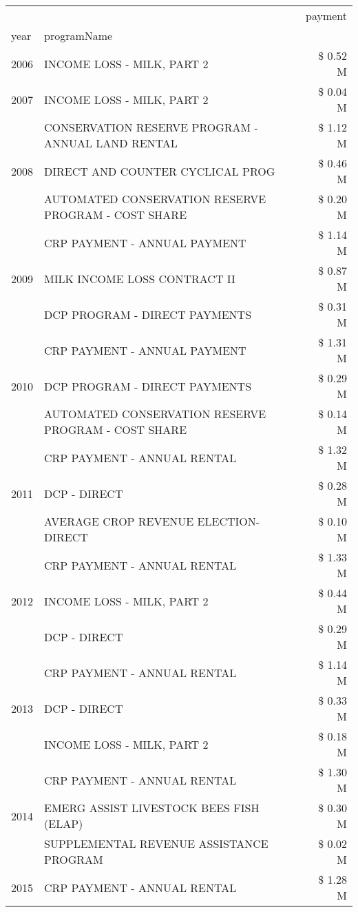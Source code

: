 \begin{tabular}{llr}
\toprule
 &  & payment \\
year & programName &  \\
\midrule
2006 & INCOME LOSS - MILK, PART 2 & \$ 0.52 M \\
\cline{1-3}
2007 & INCOME LOSS - MILK, PART 2 & \$ 0.04 M \\
\cline{1-3}
\multirow[t]{3}{*}{2008} & CONSERVATION RESERVE PROGRAM - ANNUAL LAND RENTAL & \$ 1.12 M \\
 & DIRECT AND COUNTER CYCLICAL PROG & \$ 0.46 M \\
 & AUTOMATED CONSERVATION RESERVE PROGRAM - COST SHARE & \$ 0.20 M \\
\cline{1-3}
\multirow[t]{3}{*}{2009} & CRP PAYMENT - ANNUAL PAYMENT & \$ 1.14 M \\
 & MILK INCOME LOSS CONTRACT II & \$ 0.87 M \\
 & DCP PROGRAM - DIRECT PAYMENTS & \$ 0.31 M \\
\cline{1-3}
\multirow[t]{3}{*}{2010} & CRP PAYMENT - ANNUAL PAYMENT & \$ 1.31 M \\
 & DCP PROGRAM - DIRECT PAYMENTS & \$ 0.29 M \\
 & AUTOMATED CONSERVATION RESERVE PROGRAM - COST SHARE & \$ 0.14 M \\
\cline{1-3}
\multirow[t]{3}{*}{2011} & CRP PAYMENT - ANNUAL RENTAL & \$ 1.32 M \\
 & DCP - DIRECT & \$ 0.28 M \\
 & AVERAGE CROP REVENUE ELECTION-DIRECT & \$ 0.10 M \\
\cline{1-3}
\multirow[t]{3}{*}{2012} & CRP PAYMENT - ANNUAL RENTAL & \$ 1.33 M \\
 & INCOME LOSS - MILK, PART 2 & \$ 0.44 M \\
 & DCP - DIRECT & \$ 0.29 M \\
\cline{1-3}
\multirow[t]{3}{*}{2013} & CRP PAYMENT - ANNUAL RENTAL & \$ 1.14 M \\
 & DCP - DIRECT & \$ 0.33 M \\
 & INCOME LOSS - MILK, PART 2 & \$ 0.18 M \\
\cline{1-3}
\multirow[t]{3}{*}{2014} & CRP PAYMENT - ANNUAL RENTAL & \$ 1.30 M \\
 & EMERG ASSIST LIVESTOCK BEES FISH (ELAP) & \$ 0.30 M \\
 & SUPPLEMENTAL REVENUE ASSISTANCE PROGRAM & \$ 0.02 M \\
\cline{1-3}
\multirow[t]{3}{*}{2015} & CRP PAYMENT - ANNUAL RENTAL & \$ 1.28 M \\

\end{tabular}
